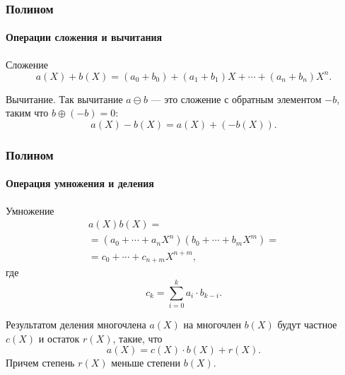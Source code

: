 \begin{frame}
    \frametitle{Полином}
    \framesubtitle{Операции сложения и вычитания}
    
    \alert{Сложение}
    \[a(X)+b(X)=(a_0+b_0) + (a_1+b_1)X + \cdots + (a_n+b_n)X^n. \]
    
    \alert{Вычитание}. Так вычитание $a\ominus b$ --- это сложение с \alert{обратным} элементом $-b$, таким что $b\oplus (-b)=0$:
    \[a(X)-b(X)=a(X)+(-b(X)).\]
    
\end{frame}


\begin{frame}
    \frametitle{Полином}
    \framesubtitle{Операция умножения и деления}
    
    \alert{Умножение}
    \[
        \begin{split}
            a(X)b(X)=\\
            =(a_0 + \cdots + a_nX^n)(b_0 + \cdots + b_mX^m)=\\
            =c_0 + \cdots + c_{n+m}X^{n+m},
        \end{split}
    \]
    где 
    \[
        c_k=\sum_{i=0}^k a_i\cdot b_{k-i}.
    \]
    
    Результатом \alert{деления} многочлена $a(X)$ на многочлен $b(X)$ будут \alert{частное} $c(X)$ и \alert{остаток} $r(X)$, такие, что \[a(X)=c(X)\cdot b(X)+r(X).\] Причем степень $r(X)$ меньше степени $b(X)$.
    
\end{frame}


